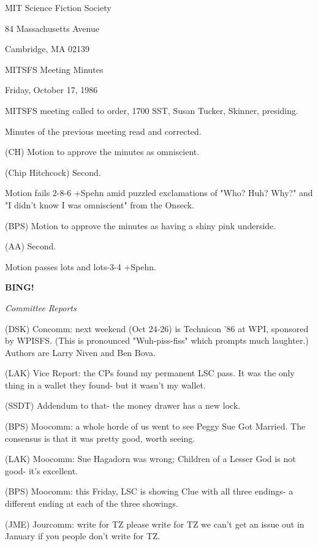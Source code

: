 \documentclass[12pt]{article}
\newcommand{\bing}{{\bf BING!} }
\newcommand{\goto}[1]{\bing \vskip 12pt \centerline{{\em{#1}}}}
\begin{document}
\begin{center}

MIT Science Fiction Society 

84 Massachusetts Avenue

Cambridge, MA 02139

\vspace{12pt}

MITSFS Meeting Minutes 

Friday, October 17, 1986

\end{center}
 
\vspace{18pt}

\setlength{\parskip}{6pt}

\noindent
MITSFS meeting called to order, 1700 SST,
Susan Tucker, Skinner, presiding.

Minutes of the previous meeting read and corrected.

(CH) Motion to approve the minutes as omniscient.

(Chip Hitchcock) Second.

Motion fails 2-8-6 +Spehn amid puzzled exclamations of "Who? Huh? Why?" and "I didn't know I was omniscient" from the Onseck.

(BPS) Motion to approve the minutes as having a shiny pink underside.

(AA) Second.

Motion passes lots and lots-3-4 +Spehn.

\goto{Committee Reports}

(DSK) Concomm: next weekend (Oct 24-26) is Technicon '86 at WPI, sponsored by WPISFS. (This is pronounced  "Wuh-piss-fiss" which prompts much laughter.) Authors are Larry Niven and Ben Bova.

(LAK) Vice Report: the CPs found my permanent LSC pass. It was the only thing in a wallet they found- but it wasn't my wallet.

(SSDT) Addendum to that- the money drawer has a new lock.

(BPS) Moocomm: a whole horde of us went to see Peggy Sue Got Married. The consensus is that it was pretty good, worth seeing.

(LAK) Moocomm: Sue Hagadorn was wrong; Children of a Lesser God is not good- it's excellent.

(BPS) Moocomm: this Friday, LSC is showing Clue with all three endings- a different ending at each of the three showings.

(JME) Jourcomm: write for TZ please write for TZ we can't get an issue out in January if you people don't write for TZ.
\end{document}
